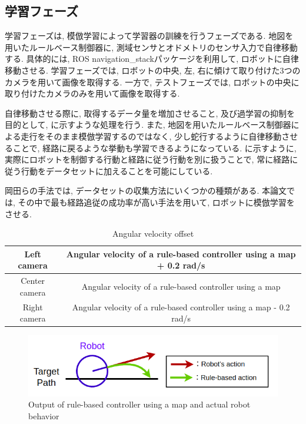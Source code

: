 \subsection{学習フェーズ}
学習フェーズは, 模倣学習によって学習器の訓練を行うフェーズである. 地図を用いたルールベース制御器に, 測域センサとオドメトリのセンサ入力で自律移動する. 具体的には, ROS navigation\_stackパッケージを利用して, ロボットに自律移動させる. 学習フェーズでは, ロボットの中央, 左, 右に傾けて取り付けた3つのカメラを用いて画像を取得する. 一方で, テストフェーズでは, ロボットの中央に取り付けたカメラのみを用いて画像を取得する. 
\par
自律移動させる際に, 取得するデータ量を増加させること, 及び過学習の抑制を目的として, に示すような処理を行う. また, 地図を用いたルールベース制御器による走行をそのまま模倣学習するのではなく, 少し蛇行するように自律移動させることで, 経路に戻るような挙動も学習できるようになっている. に示すように, 実際にロボットを制御する行動と経路に従う行動を別に扱うことで, 常に経路に従う行動をデータセットに加えることを可能にしている. 
\par
岡田らの手法では, データセットの収集方法にいくつかの種類がある. 
本論文では, その中で最も経路追従の成功率が高い手法を用いて, ロボットに模倣学習をさせる.

\begin{table}[hbtp]
  \caption{Angular velocity offset}
  \label{table:angular}
  \centering
  \begin{tabular}{|c|c|}
    \hline
    Left camera  & Angular velocity of a rule-based controller using a map + 0.2 rad/s\\
    \hline
    Center camera  & Angular velocity of a rule-based controller using a map  \\
    \hline
    Right camera  & Angular velocity of a rule-based controller using a map - 0.2 rad/s   \\
    \hline
  \end{tabular}
\end{table}

\begin{figure}[hbtp]
  \centering
 \includegraphics[keepaspectratio, scale=0.5]
      {images/dakou2.png}
 \caption{Output of rule-based controller using a map and actual robot behavior}
 \label{Fig:dakou}
\end{figure}

